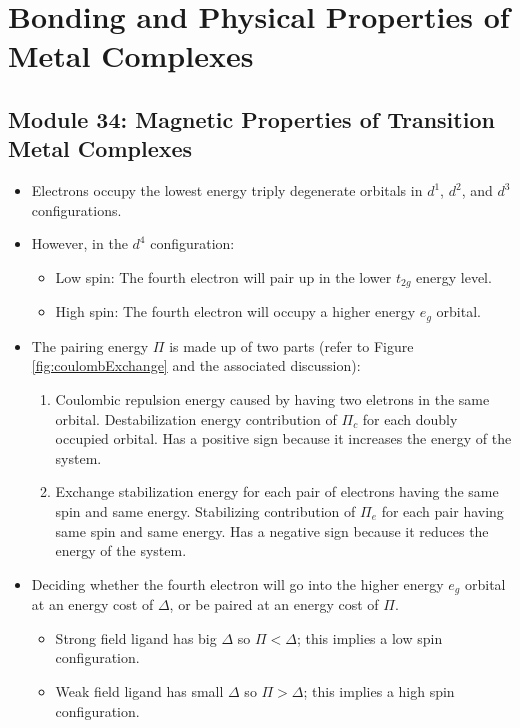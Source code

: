 \documentclass[../notes.tex]{subfiles}
\begin{document}
\chapter{Bonding and Physical Properties of Metal Complexes}
\section{Module 34: Magnetic Properties of Transition Metal Complexes}
\begin{itemize}
    \item {}Electrons occupy the lowest energy triply degenerate orbitals in $d^1$, $d^2$, and $d^3$ configurations.
    \item However, in the $d^4$ configuration:
    \begin{itemize}
        \item Low spin: The fourth electron will pair up in the lower $t_{2g}$ energy level.
        \item High spin: The fourth electron will occupy a higher energy $e_g$ orbital.
    \end{itemize}
    \item The pairing energy $\Pi$ is made up of two parts (refer to Figure \ref{fig:coulombExchange} and the associated discussion):
    \begin{enumerate}
        \item Coulombic repulsion energy caused by having two eletrons in the same orbital. Destabilization energy contribution of $\Pi_c$ for each doubly occupied orbital. Has a positive sign because it increases the energy of the system.
        \item Exchange stabilization energy for each pair of electrons having the same spin and same energy. Stabilizing contribution of $\Pi_e$ for each pair having same spin and same energy. Has a negative sign because it reduces the energy of the system.
    \end{enumerate}
    \item Deciding whether the fourth electron will go into the higher energy $e_g$ orbital at an energy cost of $\Delta$, or be paired at an energy cost of $\Pi$.
    \begin{itemize}
        \item Strong field ligand has big $\Delta$ so $\Pi<\Delta$; this implies a low spin configuration.
        \item Weak field ligand has small $\Delta$ so $\Pi>\Delta$; this implies a high spin configuration.
    \end{itemize}

\end{itemize}
\end{document}
